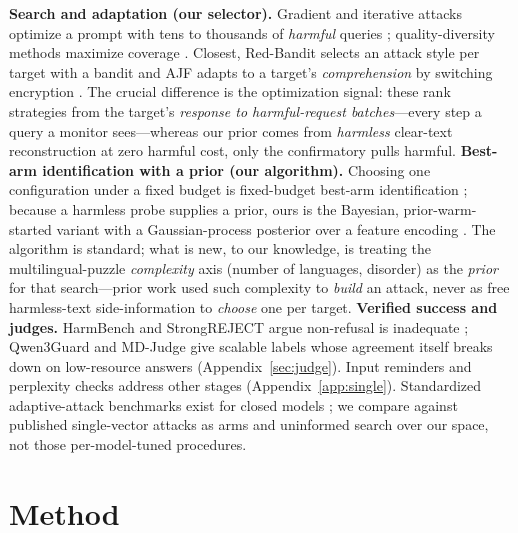 \documentclass{article}
\begin{document}
\textbf{Search and adaptation (our selector).} Gradient and iterative attacks optimize a prompt with tens to thousands of \emph{harmful} queries \citep{zou2023universal,chao2023pair,liu2024autodan,yu2023gptfuzzer,mehrotra2024tap,liu2024flipattack,ding2024renellm}; quality-diversity methods maximize coverage \citep{samvelyan2024rainbow,hong2024curiosity}. Closest, Red-Bandit selects an attack style per target with a bandit \citep{redbandit2025} and AJF adapts to a target's \emph{comprehension} by switching encryption \citep{yu2025ajf}. The crucial difference is the optimization signal: these rank strategies from the target's \emph{response to harmful-request batches}---every step a query a monitor sees---whereas our prior comes from \emph{harmless} clear-text reconstruction at zero harmful cost, only the confirmatory pulls harmful. \textbf{Best-arm identification with a prior (our algorithm).} Choosing one configuration under a fixed budget is fixed-budget best-arm identification \citep{audibert2010bestarm}; because a harmless probe supplies a prior, ours is the Bayesian, prior-warm-started variant \citep{atsidakou2022bayesbai,nguyen2025priorbai} with a Gaussian-process posterior over a feature encoding \citep{srinivas2010gpucb,snoek2012practical}. The algorithm is standard; what is new, to our knowledge, is treating the multilingual-puzzle \emph{complexity} axis (number of languages, disorder) as the \emph{prior} for that search---prior work used such complexity to \emph{build} an attack, never as free harmless-text side-information to \emph{choose} one per target. \textbf{Verified success and judges.} HarmBench and StrongREJECT argue non-refusal is inadequate \citep{mazeika2024harmbench,souly2024strongreject}; Qwen3Guard and MD-Judge give scalable labels \citep{qwen3guard2025,li2024salad} whose agreement itself breaks down on low-resource answers (Appendix~\ref{sec:judge}). Input reminders \citep{xie2023selfreminder} and perplexity checks \citep{jain2023baseline,alon2023detecting} address other stages (Appendix~\ref{app:single}). Standardized adaptive-attack benchmarks exist for closed models \citep{andriushchenko2025adaptive,chao2024jailbreakbench}; we compare against published single-vector attacks as arms and uninformed search over our space, not those per-model-tuned procedures.

\section{Method}
\label{sec:method}
\end{document}
